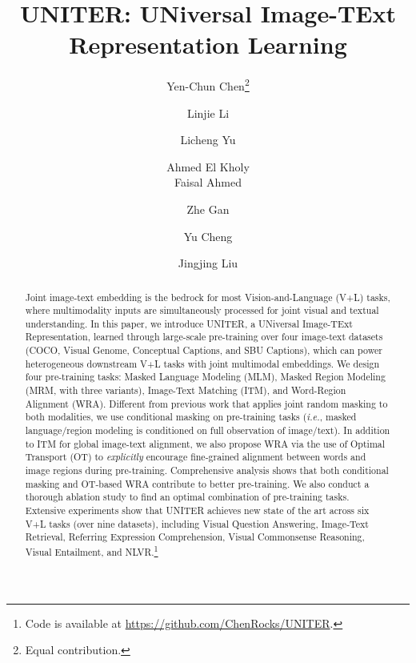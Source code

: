 \documentclass[runningheads]{llncs}
\begin{document}
\pagestyle{headings}
\mainmatter
\def\ECCVSubNumber{7093}  

\title{UNITER: UNiversal Image-TExt Representation Learning} 

\begin{comment}
\titlerunning{ECCV-20 submission ID \ECCVSubNumber} 
\authorrunning{ECCV-20 submission ID \ECCVSubNumber} 
\author{Anonymous ECCV submission}
\institute{Paper ID \ECCVSubNumber}
\end{comment}


\author{Yen-Chun Chen\thanks{Equal contribution.} \and Linjie Li \and Licheng Yu \and Ahmed El Kholy \\ Faisal Ahmed \and Zhe Gan \and Yu Cheng \and Jingjing Liu}
\maketitle

\begin{abstract}
Joint image-text embedding is the bedrock for most Vision-and-Language (V+L) tasks, where multimodality inputs are simultaneously processed for joint visual and textual understanding. In this paper, we introduce UNITER, a UNiversal Image-TExt Representation, learned through large-scale pre-training over four image-text datasets (COCO, Visual Genome, Conceptual Captions, and SBU Captions), which can power heterogeneous downstream V+L tasks with joint multimodal embeddings. We design four pre-training tasks: Masked Language Modeling (MLM), Masked Region Modeling (MRM, with three variants), Image-Text Matching (ITM), and Word-Region Alignment (WRA).
Different from previous work that applies joint random masking to both modalities, we use conditional masking on pre-training tasks (\emph{i.e.}, masked language/region modeling is conditioned on full observation of image/text). In addition to ITM for global image-text alignment, we also propose WRA via the use of Optimal Transport (OT) to \emph{explicitly} encourage fine-grained alignment between words and image regions during pre-training.  
Comprehensive analysis shows that both conditional masking and OT-based WRA contribute to better pre-training.
We also conduct a thorough ablation study to find an optimal combination of pre-training tasks.
Extensive experiments show that UNITER achieves new state of the art across six V+L tasks (over nine datasets),
including Visual Question Answering, Image-Text Retrieval, Referring Expression Comprehension, Visual Commonsense Reasoning, Visual Entailment, and NLVR.\footnote{Code is available at \url{https://github.com/ChenRocks/UNITER}.}
\end{abstract}
\end{document}
